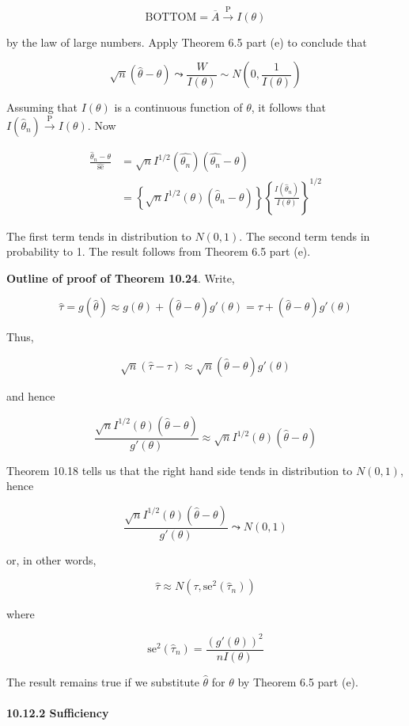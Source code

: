 \[\text{BOTTOM} = \overline{A} \xrightarrow{\text{P}} I(\theta)\]

by the law of large numbers. Apply Theorem 6.5 part (e) to conclude that

\[\sqrt{n}(\hat{\theta} - \theta) \leadsto \frac{W}{I(\theta)} \sim N \left(0, \frac{1}{I(\theta)} \right)\]

Assuming that \(I(\theta)\) is a continuous function of \(\theta\), it
follows that \(I(\hat{\theta}_{n}) \xrightarrow{\text{P}} I(\theta)\). Now

\begin{align*}
\frac{\hat{\theta}_{n} - \theta}{\hat{\text{se}}}&= \sqrt{n} I^{1/2}(\hat{\theta_{n}})(\hat{\theta_{n}} - \theta) \\
&= \left\{ \sqrt{n} I^{1/2}(\theta)(\hat{\theta}_{n} - \theta)\right\} \left\{ \frac{I(\hat{\theta}_{n})}{I(\theta)} \right\}^{1/2}
\end{align*}

The first term tends in distribution to \(N(0, 1)\). The second term
tends in probability to 1. The result follows from Theorem 6.5 part (e).

\textbf{Outline of proof of Theorem 10.24}. Write,

\[\hat{\tau} = g(\hat{\theta}) \approx g(\theta) + (\hat{\theta} - \theta)g'(\theta) = \tau + (\hat{\theta} - \theta)g'(\theta)\]

Thus,

\[\sqrt{n}(\hat{\tau} - \tau) \approx \sqrt{n}(\hat{\theta} - \theta)g'(\theta)\]

and hence

\[\frac{\sqrt{n}I^{1/2}(\theta)(\hat{\theta} - \theta)}{g'(\theta)} \approx \sqrt{n}I^{1/2}(\theta)(\hat{\theta} - \theta)\]

Theorem 10.18 tells us that the right hand side tends in distribution to
\(N(0, 1)\), hence

\[\frac{\sqrt{n}I^{1/2}(\theta)(\hat{\theta} - \theta)}{g'(\theta)} \leadsto N(0, 1)\]

or, in other words,

\[\hat{\tau} \approx N(\tau, \text{se}^{2}(\hat{\tau}_{n}))\]

where

\[\text{se}^{2}(\hat{\tau}_{n}) = \frac{(g'(\theta))^{2}}{nI(\theta)}\]

The result remains true if we substitute \(\hat{\theta}\) for \(\theta\)
by Theorem 6.5 part (e).

\paragraph{10.12.2 Sufficiency}\label{sufficiency}

